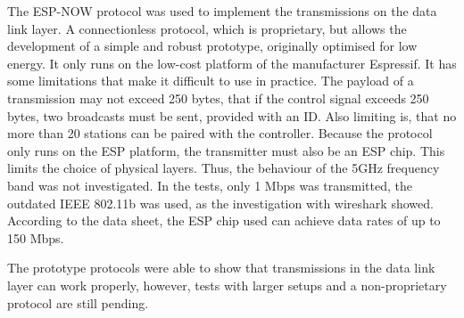 The ESP-NOW protocol was used to implement the transmissions on the data link layer.
A connectionless protocol, which is proprietary, but allows the development of a simple and robust prototype,
originally optimised for low energy.
It only runs on the low-cost platform of the manufacturer Espressif.
It has some limitations that make it difficult to use in practice.
The payload of a transmission may not exceed 250 bytes, 
that if the control signal exceeds 250 bytes, two broadcasts must be sent, provided with an ID.
Also limiting is, that no more than 20 stations can be paired with the controller.
Because the protocol only runs on the ESP platform, the transmitter must also be an ESP chip.
This limits the choice of physical layers.
Thus, the behaviour of the 5GHz frequency band was not investigated.
In the tests, only 1 Mbps was transmitted, the outdated IEEE 802.11b was used,
as the investigation with wireshark showed.
According to the data sheet, the ESP chip used can achieve data rates of up to 150 Mbps.

The prototype protocols were able to show that transmissions in the data link layer can work properly,
however, tests with larger setups and a non-proprietary protocol are still pending.
